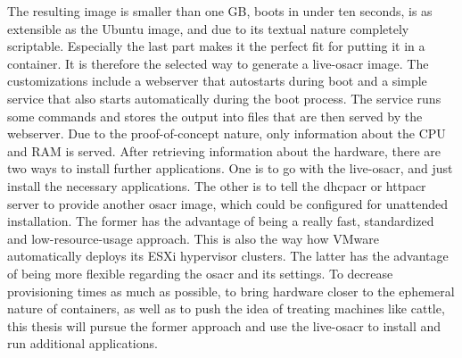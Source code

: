 The resulting image is smaller than one GB, boots in under ten seconds, is as extensible as the Ubuntu image, and due to its textual nature completely scriptable. Especially the last part makes it the perfect fit for putting it in a container. It is therefore the selected way to generate a live-\gls{osacr} image.
\newline
The customizations include a webserver that autostarts during boot and a simple service that also starts automatically during the boot process. The service runs some commands and stores the output into files that are then served by the webserver. Due to the proof-of-concept nature, only information about the CPU and RAM is served.
\newline
After retrieving information about the hardware, there are two ways to install further applications. One is to go with the live-\gls{osacr}, and just install the necessary applications. The other is to tell the \gls{dhcpacr} or \gls{httpacr} server to provide another \gls{osacr} image, which could be configured for unattended installation. The former has the advantage of being a really fast, standardized and low-resource-usage approach. This is also the way how VMware automatically deploys its ESXi hypervisor clusters. The latter has the advantage of being more flexible regarding the \gls{osacr} and its settings.
\newline
To decrease provisioning times as much as possible, to bring hardware closer to the ephemeral nature of containers, as well as to push the idea of treating machines like cattle, this thesis will pursue the former approach and use the live-\gls{osacr} to install and run additional applications.

